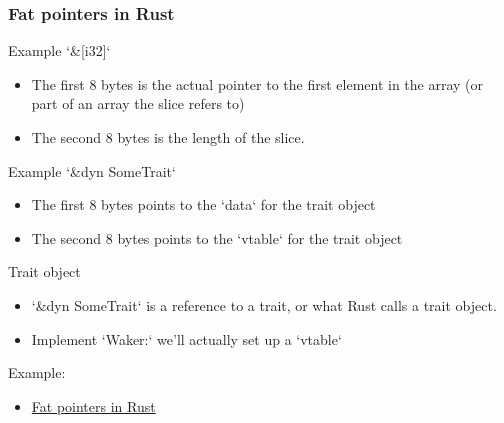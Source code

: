 \begin{frame}[fragile]
    \frametitle{Fat pointers in Rust}
% 
% 
{\color{red}Example `\&[i32]`}
 
     \begin{itemize}
         \item The first 8 bytes is the actual pointer to the first element in the array (or part of an array the slice refers to)
         \item The second 8 bytes is the length of the slice.
     \end{itemize} \pause
 
{\color{red}Example `\&dyn SomeTrait`}
 
     \begin{itemize}
         \item The first 8 bytes points to the `data` for the trait object
         \item The second 8 bytes points to the `vtable` for the trait object
     \end{itemize} \pause
 
{\color{red}Trait object}

    \begin{itemize}
        \item `\&dyn SomeTrait` is a reference to a trait, or what Rust calls a {\color{red}trait object}.
        \item Implement `Waker:` we'll actually set up a `vtable`
    \end{itemize} \pause

Example:

    \begin{itemize}
        \item \href{https://cfsamson.github.io/books-futures-explained/2_waker_context.html}{Fat pointers in Rust}
    \end{itemize}

\end{frame}

